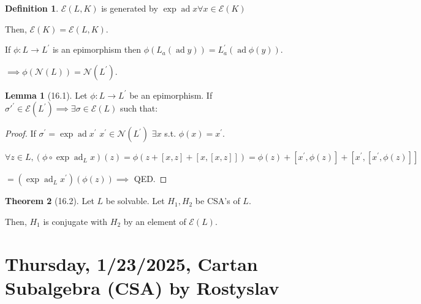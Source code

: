 \documentclass{article}
\theoremstyle{definition}
\newtheorem*{definition}{Definition}
\newtheorem{theorem}{Theorem}
\newtheorem{lemma}[theorem]{Lemma}
\begin{document}
    \begin{definition}
        \(\mathscr{E} (L,K)\) is generated by \(\exp \operatorname{ad} x \forall x\in \mathscr{E}(K)\) 
    \end{definition}

    Then, \(\mathscr{E}(K) = \mathscr{E}(L,K)\).

    If \(\phi : L \to L^{\prime}\) is an epimorphism then \(\phi(L_a(\operatorname{ad} y)) = L^{\prime}_a(\operatorname{ad} \phi(y))\).
    
    \(\implies  \phi (\mathcal{N}(L)) = \mathcal{N}(L^{\prime})\).

    \begin{lemma}
        [16.1] Let \(\phi: L \to L^{\prime}\) be an epimorphism. If \( \sigma'^{\prime} \in \mathscr{E}(L^{\prime}) \implies \exists \sigma\in \mathscr{E}(L)\) such that:

        \begin{center}
        \end{center}

    \end{lemma}

    \begin{proof}
        If \(\sigma ^{\prime} = \exp \operatorname{ad} x^{\prime}\) \(x^{\prime} \in \mathcal{N}(L^{\prime})\) \(\exists x\) s.t. \(\phi(x)=x^{\prime}\).
        
        \(\forall z\in L, (\phi \circ \exp \operatorname{ad}_L x)(z) = \phi(z + [x,z] + [x,[x,z]]) = \phi(z) + [x^{\prime}, \phi(z)] + [x^{\prime}, [x^{\prime},\phi(z)]]\)
        
        \(= (\exp \operatorname{ad}_L x^{\prime})(\phi(z)) \implies\) QED. 
        
    \end{proof}

    \begin{theorem}
        [16.2] Let \(L\) be solvable. Let \(H_1, H_2\) be CSA's of \(L\). 
        
        Then, \(H_1\) is conjugate with \(H_2\) by an element of \(\mathscr{E}(L)\).
    \end{theorem}

    \section{Thursday, 1/23/2025, Cartan Subalgebra (CSA) by Rostyslav}
\end{document}
